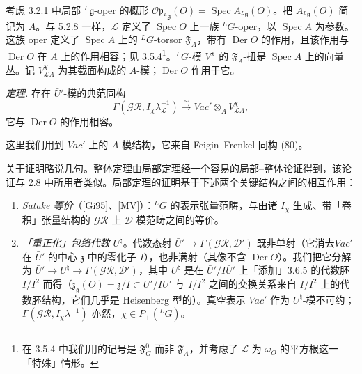 考虑 3.2.1 中局部 ${}^{L}\mathfrak{g}$-oper 的概形 $\mathcal{O}\mathfrak{p}_{{}^{L}\mathfrak{g}}(O)=\operatorname{Spec}A_{{}^{L}\mathfrak{g}}(O)$。把 $A_{{}^{L}\mathfrak{g}}(O)$ 简记为 $A$。与 5.2.8 一样，$\mathcal{L}$ 定义了 $\operatorname{Spec}O$ 上一族 ${}^{L}G$-oper，以 $\operatorname{Spec}A$ 为参数。这族 oper 定义了 $\operatorname{Spec}A$ 上的 ${}^{L}G$-torsor $\mathfrak{F}_A$，带有 $\operatorname{Der}O$ 的作用，且该作用与 $\operatorname{Der}O$ 在 $A$ 上的作用相容；见 3.5.4\footnote{在 3.5.4 中我们用的记号是 $\mathfrak{F}_G^0$ 而非 $\mathfrak{F}_A$，并考虑了 $\mathcal{L}$ 为 $\omega_O$ 的平方根这一「特殊」情形。}。${}^{L}G$-模 $V^\chi$ 的 $\mathfrak{F}_A$-扭是 $\operatorname{Spec}A$ 上的向量丛。记 $V^\chi_{\mathcal{L}A}$ 为其截面构成的 $A$-模；$\operatorname{Der}O$ 作用于它。

 \emph{定理.} 存在 $\bar U'$-模的典范同构
\begin{equation}\tag{257}
\Gamma(\mathcal{GR},I_\chi\lambda_{\mathcal{L}}^{-1})\xrightarrow{\sim}Vac'\otimes_AV^\chi_{\mathcal{L}A},
\end{equation}
它与 $\operatorname{Der}O$ 的作用相容。

这里我们用到 $Vac'$ 上的 $A$-模结构，它来自 Feigin--Frenkel 同构 (80)。

 关于证明略说几句。整体定理由局部定理经一个容易的局部--整体论证得到，该论证与 2.8 中所用者类似。局部定理的证明基于下述两个关键结构之间的相互作用：
\begin{enumerate}[label=(\roman*),leftmargin=2.2em]
\item \emph{Satake 等价}（[Gi95]、[MV]）：${}^{L}G$ 的表示张量范畴，与由诸 $I_\chi$ 生成、带「卷积」张量结构的 $\mathcal{GR}$ 上 $\mathcal{D}$-模范畴之间的等价。
\item \emph{「重正化」包络代数} $U^\natural$。代数态射 $\bar U'\to\Gamma(\mathcal{GR},\mathcal{D}')$ 既非单射（它消去$Vac'$ 在 $\bar U'$ 的中心 $\mathfrak{z}$ 中的零化子 $I$），也非满射（其像不含 $\operatorname{Der}O$）。我们把它分解为 $\bar U'\to U^\natural\to\Gamma(\mathcal{GR},\mathcal{D}')$，其中 $U^\natural$ 是在 $\bar U'/I\bar U'$ 上「添加」3.6.5 的代数胚 $I/I^2$ 而得（$\mathfrak{z}_{\mathfrak{g}}(O)=\mathfrak{z}/I\subset\bar U'/I\bar U'$ 与 $I/I^2$ 之间的交换关系来自 $I/I^2$ 上的代数胚结构，它们几乎是 Heisenberg 型的）。真空表示 $Vac'$ 作为 $U^\natural$-模不可约；$\Gamma(\mathcal{GR},I_\chi\lambda^{-1})$ 亦然，$\chi\in P_+({}^{L}G)$。
\end{enumerate}

